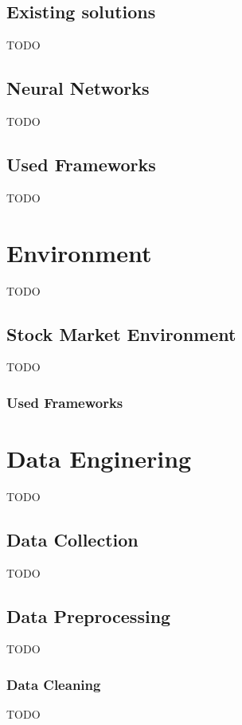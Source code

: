 \section{Existing solutions}
TODO


\section{Neural Networks}
TODO


\section{Used Frameworks}
TODO



\chapter{Environment}
TODO


\section{Stock Market Environment}
TODO

\subsection{Used Frameworks}




\chapter{Data Enginering}
TODO


\section{Data Collection}
TODO


\section{Data Preprocessing}
TODO

\subsection{Data Cleaning}
TODO


